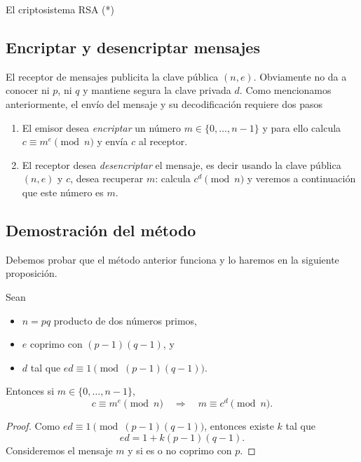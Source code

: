 \begin{section}{El criptosistema RSA (*)}
\begin{observacion*}
\end{observacion*}



\subsection*{Encriptar y desencriptar mensajes}

El receptor de mensajes publicita la clave pública $(n,e)$. Obviamente no da a conocer ni $p$, ni $q$ y mantiene segura la clave privada $d$. Como mencionamos anteriormente, el envío del mensaje y su decodificación requiere dos pasos
\begin{enumerate}[label=\textit{\alph*)}]
\item  El  emisor desea \emph{encriptar }un número $m \in \{0,\ldots,n-1\}$ y para ello calcula $c \equiv m^e \pmod{n}$ y  envía $c$ al receptor.
\item  El receptor desea \emph{desencriptar} el mensaje, es decir usando la clave pública $(n, e)$ y $c$, desea recuperar $m$: calcula $c^d \pmod{n}$ y veremos a continuación que este número es $m$. 
\end{enumerate}

\subsection*{Demostración del método}

Debemos probar que el método anterior funciona  y lo haremos en la siguiente proposición.

\begin{proposicion} \label{rsa}
    Sean 
    \begin{itemize}
        \item $n =pq$ producto de dos números primos,
        \item $e$ coprimo con $(p-1)(q-1)$, y
        \item $d$ tal que  $ed \equiv 1 \pmod{(p-1)(q-1)}$.
    \end{itemize}
    Entonces si $m \in \{0,\ldots,n-1\}$,  
    $$c \equiv m^e \pmod{n}\quad \Rightarrow \quad m \equiv c^d \pmod{n}.$$
\end{proposicion} 
\begin{proof}
Como $ed \equiv 1 \pmod{(p - 1)(q - 1)}$, entonces existe $k$ tal que  
\begin{equation}\label{rsa1}
ed = 1 + k(p - 1)(q - 1).
\end{equation}
Consideremos el mensaje $m$ y si es o no coprimo con $p$.


\end{proof}
\end{section}
